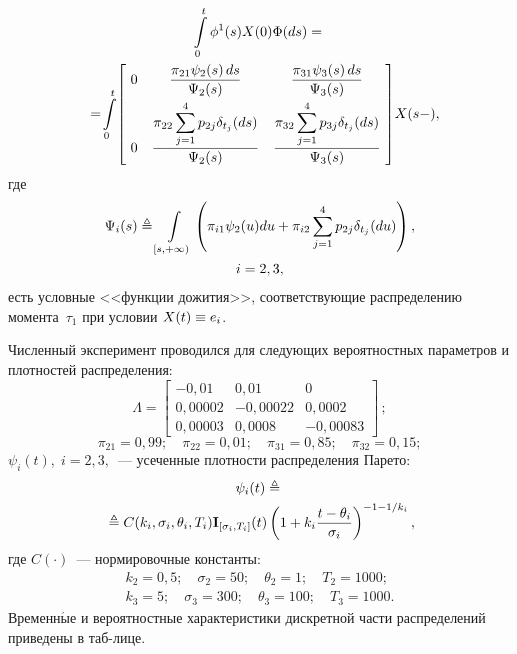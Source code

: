 \begin{multicols}{2}
\begin{multline*}
 \int\limits_0^t \phi^1(s)X(0)\Phi(ds)={}\\
 \hspace*{-3pt}{}=
  \displaystyle \!\int\limits_0^t \!\left[\!
  \begin{array}{ccc}
  0 & \displaystyle\fr{\displaystyle \pi_{21}\psi_2(s)\,ds}
  {\displaystyle \Psi_2(s)} &
  \displaystyle\fr{\displaystyle \pi_{31}\psi_3(s)\,ds}{\displaystyle \Psi_3(s)}
  \\[9pt]
  0 & \displaystyle\fr{\displaystyle \pi_{22}\sum\limits_{j=1}^{4}p_{2j}
  \delta_{t_j}(ds)}{\displaystyle \Psi_2(s)} &
  \displaystyle\fr{\displaystyle \pi_{32}\sum\limits_{j=1}^{4}p_{3j}
  \delta_{t_j}(ds)}{\displaystyle \Psi_3(s)}
  \end{array}\!
  \right]\!
  X(s-),\hspace*{-7.48343pt}
  \end{multline*}
  где
  \begin{multline*}
 \Psi_i(s) \triangleq \int\limits_{[s,+\infty)} \left(
 \pi_{i1}\psi_2(u)du+
 \pi_{i2}\sum\limits_{j=1}^{4}p_{2j}\delta_{t_j}(du)
 \right), \\ i=2,3,
  \end{multline*}
  есть условные <<функции дожития>>, соответст\-ву\-ющие распределению момента~$\tau_1$
  при условии $X(t)\hm\equiv e_i$.

  Численный эксперимент проводился для следующих вероятностных параметров и
  плотностей распределения:
  \begin{equation*}
  \Lambda = \left[
  \begin{array}{ccc}
-0{,}01 & 0{,}01 & 0 \\
0{,}00002 & -0{,}00022 & 0{,}0002 \\
0{,}00003 & 0{,}0008 & -0{,}00083
  \end{array}
  \right]\,;
  \end{equation*}
\begin{equation*}
  \pi_{21} = 0{,}99; \quad \pi_{22} = 0{,}01;
  \quad \pi_{31} = 0{,}85; \quad \pi_{32} = 0{,}15;
\end{equation*}
$\psi_i(t),\; i=2,3,$~--- усеченные плотности распределения Парето:
\begin{multline*}
\psi_i(t) \triangleq{}\\
{}\triangleq C(k_i,\sigma_i,\theta_i,T_i)\mathbf{I}_{[\sigma_i,T_i]}(t)
\left(1+k_i\displaystyle\frac{\displaystyle t-\theta_i\mathstrut}{\displaystyle \sigma_i\mathstrut}
\right)^{-1-{1}/{k_i}},
\end{multline*}
где $C(\cdot)$~--- нормировочные константы:
\begin{gather*}
k_2= 0{,}5; \quad \sigma_2= 50; \quad \theta_2= 1; \quad T_2= 1000; \\
k_3= 5; \quad \sigma_3= 300; \quad \theta_3= 100; \quad T_3= 1000.
\end{gather*}
Временн$\acute{\mbox{ы}}$е и вероятностные характеристики дискретной части
распределений приведены в таб-\linebreak лице.


\end{multicols}
